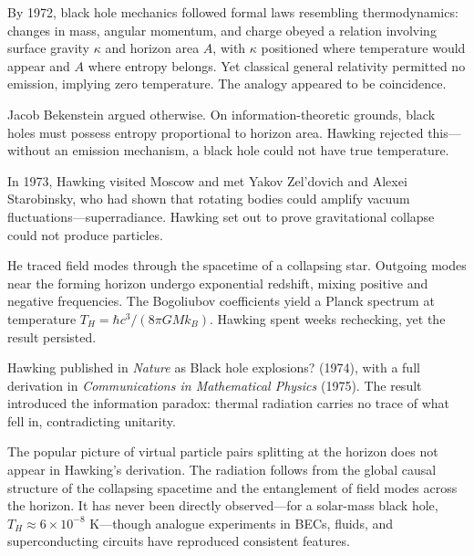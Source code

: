 \begin{commentary}
By 1972, black hole mechanics followed formal laws resembling thermodynamics: changes in mass, angular momentum, and charge obeyed a relation involving surface gravity $\kappa$ and horizon area $A$, with $\kappa$ positioned where temperature would appear and $A$ where entropy belongs. Yet classical general relativity permitted no emission, implying zero temperature. The analogy appeared to be coincidence.

Jacob Bekenstein argued otherwise. On information-theoretic grounds, black holes must possess entropy proportional to horizon area. Hawking rejected this—without an emission mechanism, a black hole could not have true temperature.

In 1973, Hawking visited Moscow and met Yakov Zel'dovich and Alexei Starobinsky, who had shown that rotating bodies could amplify vacuum fluctuations—superradiance. Hawking set out to prove gravitational collapse could not produce particles.

He traced field modes through the spacetime of a collapsing star. Outgoing modes near the forming horizon undergo exponential redshift, mixing positive and negative frequencies. The Bogoliubov coefficients yield a Planck spectrum at temperature $T_H = \hbar c^3/(8\pi G M k_B)$. Hawking spent weeks rechecking, yet the result persisted.

Hawking published in \textit{Nature} as \DSQOpen{}Black hole explosions?\DSQClose{} (1974), with a full derivation in \textit{Communications in Mathematical Physics} (1975). The result introduced the information paradox: thermal radiation carries no trace of what fell in, contradicting unitarity.

The popular picture of virtual particle pairs splitting at the horizon does not appear in Hawking's derivation. The radiation follows from the global causal structure of the collapsing spacetime and the entanglement of field modes across the horizon. It has never been directly observed—for a solar-mass black hole, $T_H \approx 6 \times 10^{-8}$ K—though analogue experiments in BECs, fluids, and superconducting circuits have reproduced consistent features.

\end{commentary}

